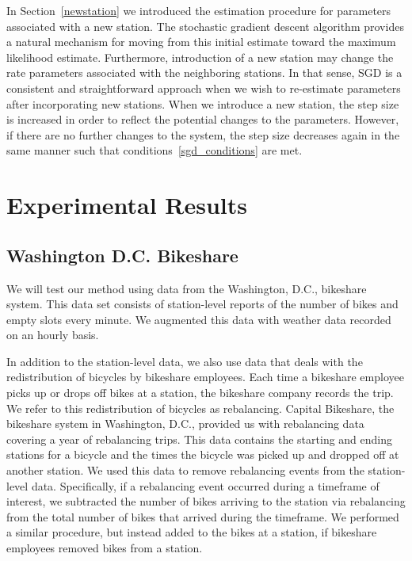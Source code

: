 \documentclass{acm_proc_article-sp}
\begin{document}
In Section~\ref{newstation} we introduced the estimation procedure for parameters associated with a new station.  The stochastic gradient descent algorithm provides a natural mechanism for moving from this initial estimate toward the maximum likelihood estimate. Furthermore, introduction of a new station may change the rate parameters associated with the neighboring stations.  In that sense, SGD is a consistent and straightforward approach when we wish to re-estimate parameters after incorporating new stations.  When we introduce a new station, the step size is increased in order to reflect the potential changes to the parameters.  However, if there are no further changes to the system, the step size decreases again in the same manner such that conditions~\eqref{sgd_conditions} are met.



\section{Experimental Results}

\vspace{0.25cm}

\subsection{Washington D.C. Bikeshare}
\vspace{0.25cm}
We will test our method using data from the Washington, D.C., bikeshare system. This data set consists of station-level reports of the number of bikes and empty slots every minute. We augmented this data with weather data recorded on an hourly basis.

In addition to the station-level data, we also use data that deals with the redistribution of bicycles by bikeshare employees. Each time a bikeshare employee picks up or drops off bikes at a station, the bikeshare company records the trip. We refer to this redistribution of bicycles as rebalancing. Capital Bikeshare, the bikeshare system in Washington, D.C.,  provided us with rebalancing data covering a year of rebalancing trips. This data contains the starting and ending stations for a bicycle and the times the bicycle was picked up and dropped off at another station. We used this data to remove rebalancing events from the station-level data. Specifically, if a rebalancing event occurred during a timeframe of interest, we subtracted the number of bikes arriving to the station via rebalancing from the total number of bikes that arrived during the timeframe. We performed a similar procedure, but instead added to the bikes at a station, if bikeshare employees removed bikes from a station.
\end{document}
